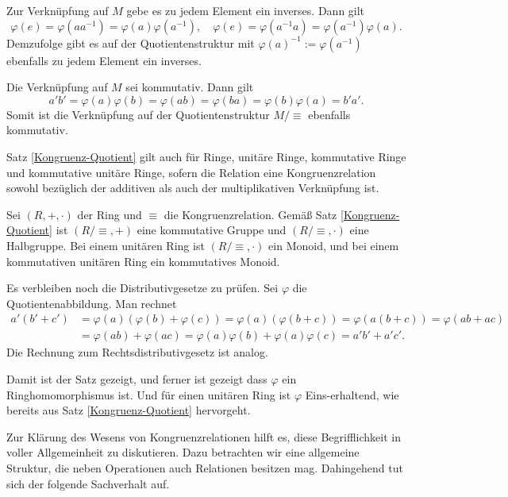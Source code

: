 Zur Verknüpfung auf $M$ gebe es zu jedem Element ein inverses. Dann gilt
\[\varphi(e) = \varphi(aa^{-1}) = \varphi(a)\varphi(a^{-1}),\quad
\varphi(e) = \varphi(a^{-1}a) = \varphi(a^{-1})\varphi(a).\]
Demzufolge gibt es auf der Quotientenstruktur mit
$\varphi(a)^{-1}:=\varphi(a^{-1})$ ebenfalls zu jedem Element
ein inverses.

Die Verknüpfung auf $M$ sei kommutativ. Dann gilt
\[a'b' = \varphi(a)\varphi(b) = \varphi(ab) = \varphi(ba)
= \varphi(b)\varphi(a) = b'a'.\]
Somit ist die Verknüpfung auf der Quotientenstruktur $M/\equiv$ ebenfalls
kommutativ.\,\qedsymbol

\begin{Satz}\label{Kongruenz-Ring-Quotient}
Satz \ref{Kongruenz-Quotient} gilt auch für Ringe, unitäre Ringe,
kommutative Ringe und kommutative unitäre Ringe, sofern die
Relation eine Kongruenzrelation sowohl bezüglich der additiven
als auch der multiplikativen Verknüpfung ist.
\end{Satz}
\begin{Beweis}
Sei $(R,+,\cdot)$ der Ring und $\equiv$ die
Kongruenzrelation. Gemäß Satz \ref{Kongruenz-Quotient} ist
$(R/\equiv,+)$ eine kommutative Gruppe und $(R/\equiv,\cdot)$
eine Halbgruppe. Bei einem unitären Ring ist $(R/\equiv,\cdot)$
ein Monoid, und bei einem kommutativen unitären Ring ein
kommutatives Monoid.

Es verbleiben noch die Distributivgesetze zu prüfen.
Sei $\varphi$ die Quotientenabbildung. Man rechnet
\begin{align*}
a'(b'+c') &= \varphi(a)(\varphi(b)+\varphi(c)) = \varphi(a)(\varphi(b+c))
= \varphi(a(b+c)) = \varphi(ab+ac)\\
&= \varphi(ab)+\varphi(ac) = \varphi(a)\varphi(b)+\varphi(a)\varphi(c)
= a'b'+a'c'.
\end{align*}
Die Rechnung zum Rechtsdistributivgesetz ist analog.

Damit ist der Satz gezeigt, und ferner ist gezeigt dass $\varphi$ ein
Ringhomomorphismus ist. Und für einen unitären Ring ist $\varphi$
Eins-erhaltend, wie bereits aus Satz \ref{Kongruenz-Quotient}
hervorgeht.\,\qedsymbol
\end{Beweis}

\noindent
Zur Klärung des Wesens von Kongruenzrelationen hilft es, diese Begrifflichkeit
in voller Allgemeinheit zu diskutieren. Dazu betrachten wir eine allgemeine
Struktur, die neben Operationen auch Relationen besitzen mag.
Dahingehend tut sich der folgende Sachverhalt auf.

